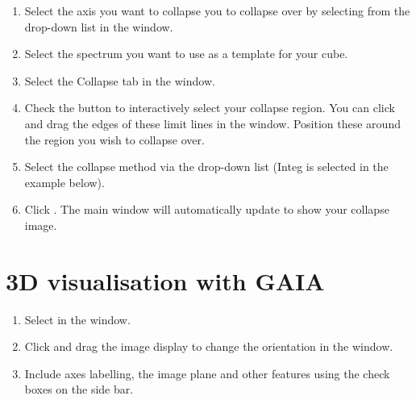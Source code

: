 \documentclass[11pt,oneside,chapters]{starlink}
\begin{document}
\begin{enumerate}[label=(\textbf{\arabic*})]

\item Select the axis you want to collapse you to collapse over by
selecting from the  drop-down list in the
 window.

\item Select the spectrum you want to use as a template for your cube.

\item Select the Collapse tab in the  window.

\item Check the  button to
interactively select your collapse region.  You can click and drag the
edges of these limit lines in the  window.
Position these around the region you wish to collapse over.

\item Select the collapse method via the  drop-down list (Integ is selected in the example below).

\item Click . The main window will automatically update
to show your collapse image.
\end{enumerate}

\section{3D visualisation with GAIA}

\begin{enumerate}[label=(\textbf{\arabic*})]
\item Select  in the  window.


\item Click and drag the image display to change the orientation in
the  window.


\item Include axes labelling, the image plane and other features using
the check boxes on the side bar.
\end{enumerate}
\end{document}
